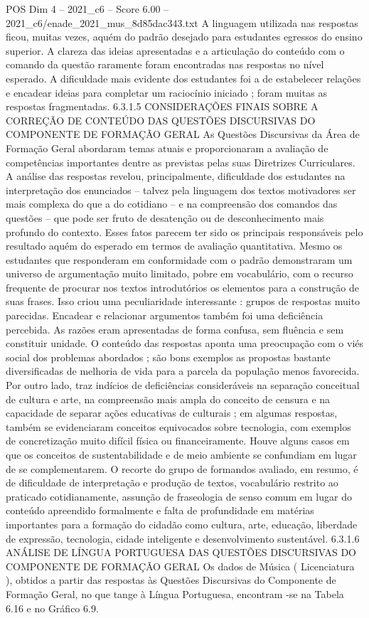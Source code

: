 \begin{textsample}{POS Dim 4 – 2021\_c6 – Score 6.00 – 2021\_c6/enade\_2021\_mus\_8d85dac343.txt}
A linguagem utilizada nas respostas ficou, muitas vezes, aquém do padrão desejado para estudantes egressos do ensino superior.
A clareza das ideias apresentadas e a articulação do conteúdo com o comando da questão raramente foram encontradas nas respostas no nível esperado.
A dificuldade mais evidente dos estudantes foi a de estabelecer relações e encadear ideias para completar um raciocínio iniciado ; foram muitas as respostas fragmentadas. 6.3.1.5 CONSIDERAÇÕES FINAIS SOBRE A CORREÇÃO DE CONTEÚDO DAS QUESTÕES DISCURSIVAS DO COMPONENTE DE FORMAÇÃO GERAL As Questões Discursivas da Área de Formação Geral abordaram temas atuais e proporcionaram a avaliação de competências importantes dentre as previstas pelas suas Diretrizes Curriculares.
A análise das respostas revelou, principalmente, dificuldade dos estudantes na interpretação dos enunciados – talvez pela linguagem dos textos motivadores ser mais complexa do que a do cotidiano – e na compreensão dos comandos das questões – que pode ser fruto de desatenção ou de desconhecimento mais profundo do contexto.
Esses fatos parecem ter sido os principais responsáveis pelo resultado aquém do esperado em termos de avaliação quantitativa.
Mesmo os estudantes que responderam em conformidade com o padrão demonstraram um universo de argumentação muito limitado, pobre em vocabulário, com o recurso frequente de procurar nos textos introdutórios os elementos para a construção de suas frases.
Isso criou uma peculiaridade interessante : grupos de respostas muito parecidas.
Encadear e relacionar argumentos também foi uma deficiência percebida.
As razões eram apresentadas de forma confusa, sem fluência e sem constituir unidade.
O conteúdo das respostas aponta uma preocupação com o viés social dos problemas abordados ; são bons exemplos as propostas bastante diversificadas de melhoria de vida para a parcela da população menos favorecida.
Por outro lado, traz indícios de deficiências consideráveis na separação conceitual de cultura e arte, na compreensão mais ampla do conceito de censura e na capacidade de separar ações educativas de culturais ; em algumas respostas, também se evidenciaram conceitos equivocados sobre tecnologia, com exemplos de concretização muito difícil física ou financeiramente.
Houve alguns casos em que os conceitos de sustentabilidade e de meio ambiente se confundiam em lugar de se complementarem.
O recorte do grupo de formandos avaliado, em resumo, é de dificuldade de interpretação e produção de textos, vocabulário restrito ao praticado cotidianamente, assunção de fraseologia de senso comum em lugar do conteúdo apreendido formalmente e falta de profundidade em matérias importantes para a formação do cidadão como cultura, arte, educação, liberdade de expressão, tecnologia, cidade inteligente e desenvolvimento sustentável. 6.3.1.6 ANÁLISE DE LÍNGUA PORTUGUESA DAS QUESTÕES DISCURSIVAS DO COMPONENTE DE FORMAÇÃO GERAL Os dados de Música ( Licenciatura ), obtidos a partir das respostas às Questões Discursivas do Componente de Formação Geral, no que tange à Língua Portuguesa, encontram -se na Tabela 6.16 e no Gráfico 6.9.

\end{textsample}
